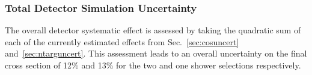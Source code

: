 \subsubsection{Total Detector Simulation Uncertainty}
	
The overall detector systematic effect is assessed by taking the quadratic sum of each of the currently estimated effects from Sec.~\ref{sec:cosuncert} and~\ref{sec:ntarguncert}.  This assessment leads to an overall uncertainty on the final cross section of 12\% and 13\% for the two and one shower selections respectively. 

\clearpage 
